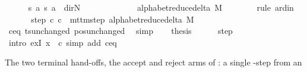 \begin{isabellebody}
\ \ \ \ \isamarkupfalse%
\ {\isachardoublequoteopen}{\isacharparenleft}{\kern0pt}{\isacharquery}{\kern0pt}s{\isacharcomma}{\kern0pt}\ {\isacharquery}{\kern0pt}a{\isacharcomma}{\kern0pt}\ {\isacharquery}{\kern0pt}s{\isacharprime}{\kern0pt}{\isacharcomma}{\kern0pt}\ {\isacharquery}{\kern0pt}a{\isacharcomma}{\kern0pt}\ {\isacharparenleft}{\kern0pt}{\isasymlambda}{\isacharunderscore}{\kern0pt}{\isachardot}{\kern0pt}\ dir{\isachardot}{\kern0pt}N{\isacharparenright}{\kern0pt}{\isacharparenright}{\kern0pt}\isanewline
\ \ \ \ \ \ \ \ \ \ \ \ {\isasymin}\ alphabet{\isacharunderscore}{\kern0pt}reduce{\isacharunderscore}{\kern0pt}delta\ M{\isachardoublequoteclose}\isanewline
\ \ \ \ \ \ \isamarkupfalse%
\ {\isacharparenleft}{\kern0pt}rule\ ard{\isacharunderscore}{\kern0pt}in{\isacharparenright}{\kern0pt}\isanewline
\ \ \isamarkupfalse%
\isanewline
\ \ \isamarkupfalse%
\ step{\isacharcolon}{\kern0pt}\ {\isachardoublequoteopen}{\isacharparenleft}{\kern0pt}c{\isacharprime}{\kern0pt}{\isacharcomma}{\kern0pt}\ {\isacharquery}{\kern0pt}c{\isacharprime}{\kern0pt}{\isacharprime}{\kern0pt}{\isacharparenright}{\kern0pt}\ {\isasymin}\ mttm{\isacharunderscore}{\kern0pt}step\ {\isacharparenleft}{\kern0pt}alphabet{\isacharunderscore}{\kern0pt}reduce{\isacharunderscore}{\kern0pt}delta\ M{\isacharparenright}{\kern0pt}{\isachardoublequoteclose}\isanewline
\ \ \ \ \isamarkupfalse%
\ c{\isacharprime}{\kern0pt}{\isacharunderscore}{\kern0pt}eq\ ts{\isacharunderscore}{\kern0pt}unchanged\ pos{\isacharunderscore}{\kern0pt}unchanged\ \isamarkupfalse%
\ simp\isanewline
\ \ \isamarkupfalse%
\ {\isacharquery}{\kern0pt}thesis\isanewline
\ \ \ \ \isamarkupfalse%
\ step\ \isamarkupfalse%
\ {\isacharparenleft}{\kern0pt}intro\ exI{\isacharbrackleft}{\kern0pt}\ x\ {\isacharequal}{\kern0pt}\ {\isacharquery}{\kern0pt}c{\isacharprime}{\kern0pt}{\isacharprime}{\kern0pt}{\isacharbrackright}{\kern0pt}{\isacharparenright}{\kern0pt}\ {\isacharparenleft}{\kern0pt}simp\ add{\isacharcolon}{\kern0pt}\ c{\isacharprime}{\kern0pt}{\isacharunderscore}{\kern0pt}eq{\isacharparenright}{\kern0pt}\isanewline
{}\isamarkupfalse%
%
\endisatagproof
{\isafoldproof}%
%
\isadelimproof
%
\endisadelimproof
%
\begin{isamarkuptext}%
The two terminal hand-offs, the accept and reject arms of
  : a single -step from an

\end{isamarkuptext}
\end{isabellebody}
